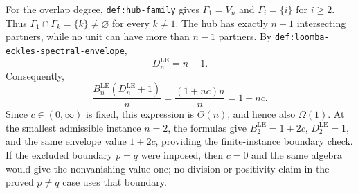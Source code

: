 For the overlap degree, \texttt{def:hub-family} gives \(\Gamma_1=V_n\) and \(\Gamma_i=\{i\}\) for \(i\ge2\).  Thus \(\Gamma_1\cap\Gamma_k=\{k\}\ne\varnothing\) for every \(k\ne1\).  The hub has exactly \(n-1\) intersecting partners, while no unit can have more than \(n-1\) partners.  By \texttt{def:loomba-eckles-spectral-envelope},
\[
 D_n^{\mathrm{LE}}=n-1.
\]
Consequently,
\[
 \frac{B_n^{\mathrm{LE}}(D_n^{\mathrm{LE}}+1)}{n}
 =\frac{(1+nc)n}{n}=1+nc.
\]
Since \(c\in(0,\infty)\) is fixed, this expression is \(\Theta(n)\), and hence also \(\Omega(1)\).  At the smallest admissible instance \(n=2\), the formulas give \(B_2^{\mathrm{LE}}=1+2c\), \(D_2^{\mathrm{LE}}=1\), and the same envelope value \(1+2c\), providing the finite-instance boundary check.  If the excluded boundary \(p=q\) were imposed, then \(c=0\) and the same algebra would give the nonvanishing value one; no division or positivity claim in the proved \(p\ne q\) case uses that boundary.